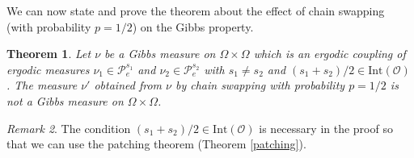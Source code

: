 \documentclass[11pt]{article}
\newtheorem{thm}{Theorem}[subsection]
\theoremstyle{remark}
\newtheorem{rem}[thm]{Remark}
\theoremstyle{definition}
\newcommand{\Prob}{\mathcal P}
\newcommand{\mc}[1]{\mathcal{#1}}
\begin{document}
We can now state and prove the theorem about the effect of chain swapping (with probability $p=1/2$) on the Gibbs property.

\begin{thm}\label{theorem: Preservation of the Gibbs prop}
	Let $\nu$ be a Gibbs measure on $\Omega\times \Omega$ which is an ergodic coupling of ergodic measures $\nu_1\in \Prob^{s_1}_e$ and $\nu_2\in \Prob^{s_2}_e$ with $s_1\neq s_2$ and $(s_1+s_2)/2\in \text{Int}(\mc O)$. The measure $\nu'$ obtained from $\nu$ by chain swapping with probability $p=1/2$ is not a Gibbs measure on $\Omega\times \Omega$. 
\end{thm}
\begin{rem}
    The condition $(s_1 + s_2)/2\in \text{Int}(\mc O)$ is necessary in the proof so that we can use the patching theorem (Theorem \ref{patching}).
\end{rem}
\end{document}
